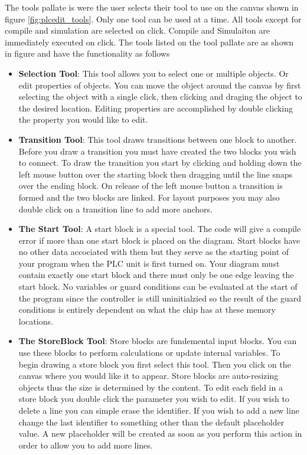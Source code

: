 The tools pallate is were the user selects their tool to use on the canvas shown in figure \ref{fig:plcedit_tools}. Only one tool can be used at a time. All tools except for compile and simulation are selected on click. Compile and Simulaiton are immediately executed on click.
The tools listed on the tool pallate are as shown in figure %
and have the functionality as follows
\begin{itemize}
\item \textbf{Selection Tool}: This tool allows you to select one or multiple objects. Or edit properties of objects. You can move the object around the canvas by first selecting the object with a single click, then clicking and draging the object to the desired location. Editing properties are accomplished by double clicking the property you would like to edit.
\item \textbf{Transition Tool}: This tool draws transitions between one block to another. Before you draw a transition you must have created the two blocks you wish to connect. To draw the transition you start by clicking and holding down the left mouse button over the starting block then dragging until the line snaps over the ending block. On release of the left mouse button a transition is formed and the two blocks are linked. For layout purposes you may also double click on a transition  line to add more anchors.
\item \textbf{The Start Tool}: A start block is a special tool. The code will give a compile error if more than one start block is placed on the diagram. Start blocks have no other data accociated with them but they serve as the starting point of your program when the PLC unit is first turned on. Your diagram must contain exactly one start block and there must only be one edge leaving the start block. No variables or guard conditions can be evaluated at the start of the program since the controller is still uninitialzied so the result of the guard conditions is entirely dependent on what the chip has at these memory locations.
\item \textbf{The StoreBlock Tool}: Store blocks are fundemental input blocks. You can use these blocks to perform calculations or update internal variables. To begin drawing a store block you first select this tool. Then you click on the canvas where you would like it to appear. Store blocks are auto-resizing objects thus the size is determined by the content. To edit each field in a store block you double click the parameter you wish to edit. If you wish to delete a line you can simple erase the identifier. If you wish to add a new line change the last identifier to something other than the default placeholder value. A new placeholder will be created as soon as you perform this action in order to allow you to add more lines.

\end{itemize}
